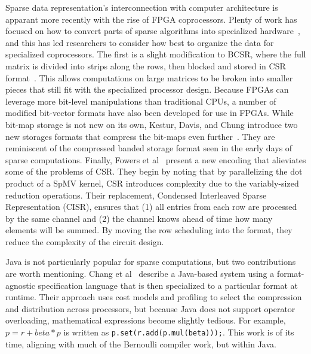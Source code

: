 Sparse data representation's interconnection with computer architecture is apparant more recently with the rise of FPGA coprocessors. 
Plenty of work has focused on how to convert parts of sparse algorithms into specialized hardware~\cite{elgindy2002sparse,zhuo2005sparse,gregg2007fpga,prasanna2007sparse,jain2020domain,kapre2009parallelizing}, and this has led researchers to consider how best to organize the data for specialized coprocessors. 
The first is a slight modification to BCSR, where the full matrix is divided into strips along the rows, then blocked and stored in CSR format~\cite{sun2007sparse}. 
This allows computations on large matrices to be broken into smaller pieces that still fit with the specialized processor design.
Because FPGAs can leverage more bit-level manipulations than traditional CPUs, a number of modified bit-vector formats have also been developed for use in FPGAs. 
While bit-map storage is not new on its own, Kestur, Davis, and Chung introduce two new storages formats that compress the bit-maps even further~\cite{kestur2012towards}.
They are reminiscent of the compressed banded storage format seen in the early days of sparse computations.
Finally, Fowers et al~\cite{fowers2014high} present a new encoding that alieviates some of the problems of CSR.
They begin by noting that by parallelizing the dot product of a SpMV kernel, CSR introduces complexity due to the variably-sized reduction operations.
Their replacement, Condensed Interleaved Sparse Representation (CISR), ensures that (1) all entries from each row are processed by the same channel and (2) the channel knows ahead of time how many elements will be summed.
By moving the row scheduling into the format, they reduce the complexity of the circuit design.






\cite{im2001optimizing}
\cite{im2004sparsity}

\cite{vuduc2005oski}
\cite{choi2010model}


Java is not particularly popular for sparse computations, but two contributions are worth mentioning.
Chang et al~\cite{chang1997towards} describe a Java-based system using a format-agnostic specification language that is then specialized to a particular format at runtime.
Their approach uses cost models and profiling to select the compression and distribution across processors, but because Java does not support operator overloading, mathematical expressions become slightly tedious.
For example, $p = r + beta * p$ is written as \verb_p.set(r.add(p.mul(beta)));_.
This work is of its time, aligning with much of the Bernoulli compiler work, but within Java.


